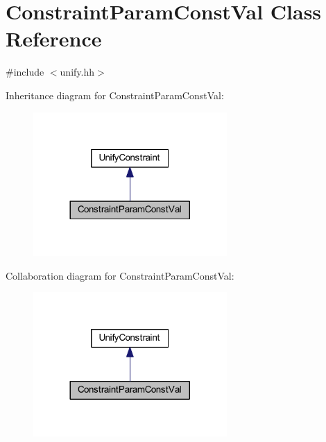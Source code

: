 \hypertarget{class_constraint_param_const_val}{}\section{Constraint\+Param\+Const\+Val Class Reference}
\label{class_constraint_param_const_val}


{\ttfamily \#include $<$unify.\+hh$>$}



Inheritance diagram for Constraint\+Param\+Const\+Val\+:
\nopagebreak
\begin{figure}[H]
\begin{center}
\leavevmode
\includegraphics[width=209pt]{class_constraint_param_const_val__inherit__graph}
\end{center}
\end{figure}


Collaboration diagram for Constraint\+Param\+Const\+Val\+:
\nopagebreak
\begin{figure}[H]
\begin{center}
\leavevmode
\includegraphics[width=209pt]{class_constraint_param_const_val__coll__graph}
\end{center}
\end{figure}
